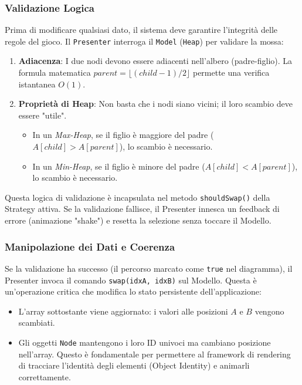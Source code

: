 \documentclass[openany]{theme/uniprthesis}
\begin{document}
\subsubsection{Validazione Logica}
Prima di modificare qualsiasi dato, il sistema deve garantire l'integrità delle regole del gioco.
Il \texttt{Presenter} interroga il \texttt{Model} (\texttt{Heap}) per validare la mossa:
\begin{enumerate}
    \item \textbf{Adiacenza}: I due nodi devono essere adiacenti nell'albero (padre-figlio). La formula matematica $parent = \lfloor (child - 1) / 2 \rfloor$ permette una verifica istantanea $O(1)$.
    \item \textbf{Proprietà di Heap}: Non basta che i nodi siano vicini; il loro scambio deve essere "utile".
    \begin{itemize}
        \item In un \textit{Max-Heap}, se il figlio è maggiore del padre ($A[child] > A[parent]$), lo scambio è necessario.
        \item In un \textit{Min-Heap}, se il figlio è minore del padre ($A[child] < A[parent]$), lo scambio è necessario.
    \end{itemize}
\end{enumerate}
Questa logica di validazione è incapsulata nel metodo \texttt{shouldSwap()} della Strategy attiva. Se la validazione fallisce, il Presenter innesca un feedback di errore (animazione "shake") e resetta la selezione senza toccare il Modello.

\subsubsection{Manipolazione dei Dati e Coerenza}
Se la validazione ha successo (il percorso marcato come \texttt{true} nel diagramma), il Presenter invoca il comando \texttt{swap(idxA, idxB)} sul Modello.
Questa è un'operazione critica che modifica lo stato persistente dell'applicazione:
\begin{itemize}
    \item L'array sottostante viene aggiornato: i valori alle posizioni $A$ e $B$ vengono scambiati.
    \item Gli oggetti \texttt{Node} mantengono i loro ID univoci ma cambiano posizione nell'array. Questo è fondamentale per permettere al framework di rendering di tracciare l'identità degli elementi (Object Identity) e animarli correttamente.
\end{itemize}
\end{document}
